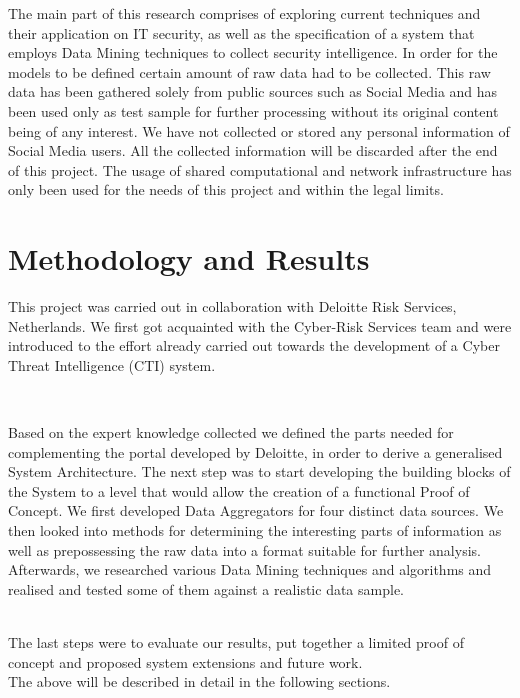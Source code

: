 \documentclass[12pt]{article}
\begin{document}
The main part of this research comprises of exploring current techniques and their application on IT security, as well as the specification of a system that employs Data Mining techniques to collect security intelligence. In order for the models to be defined certain amount of raw data had to be collected. This raw data has been gathered solely from public sources such as Social Media and has been used only as test sample for further processing without its original content being of any interest. We have not collected or stored any personal information of Social Media users. All the collected information will be discarded after the end of this project. The usage of shared computational and network infrastructure has only been used for the needs of this project and within the legal limits.

\newpage
\section{Methodology and Results}
\parbox{\linewidth}{
This project was carried out in collaboration with Deloitte Risk Services, Netherlands. We first got acquainted with the Cyber-Risk Services team and were introduced to the effort already carried out towards the development of a Cyber Threat Intelligence (CTI) system. 
}
\hfill \break \\
\parbox{\linewidth}{
Based on the expert knowledge collected we defined the parts needed for complementing the portal developed by Deloitte, in order to derive a generalised System Architecture. The next step was to start developing the building blocks of the System to a level that would allow the creation of a functional Proof of Concept. We first developed Data Aggregators for four distinct data sources. We then looked into methods for determining the interesting parts of information as well as prepossessing the raw data into a format suitable for further analysis. Afterwards, we researched various Data Mining techniques and algorithms and realised and tested some of them against a realistic data sample.
}
\hfill \break \\
The last steps were to evaluate our results, put together a limited proof of concept and proposed system extensions and future work. 
\hfill \break \\
The above will be described in detail in the following sections. 
\end{document}
